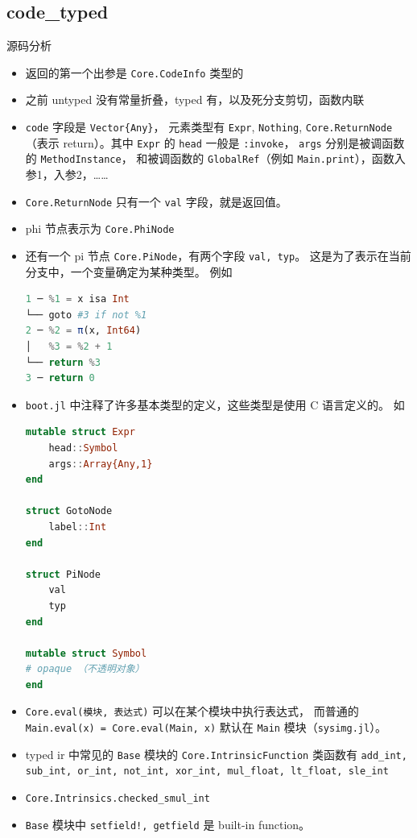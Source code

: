 \subsection{code_typed} 源码分析
\begin{itemize}
\item 返回的第一个出参是 \verb`Core.CodeInfo` 类型的
\item 之前 untyped 没有常量折叠，typed 有，以及死分支剪切，函数内联
\item \verb`code` 字段是 \verb`Vector{Any}`， 元素类型有 \verb`Expr`, \verb`Nothing`, \verb`Core.ReturnNode`（表示 return）。其中 \verb`Expr` 的 \verb`head` 一般是 \verb`:invoke`， \verb`args` 分别是被调函数的 \verb`MethodInstance`， 和被调函数的 \verb`GlobalRef`（例如 \verb`Main.print`），函数入参1，入参2，……
\item \verb`Core.ReturnNode` 只有一个 \verb`val` 字段，就是返回值。
\item phi 节点表示为 \verb`Core.PhiNode`
\item 还有一个 pi 节点 \verb`Core.PiNode`，有两个字段 \verb`val, typ`。 这是为了表示在当前分支中，一个变量确定为某种类型。 例如
\begin{lstlisting}[language=julia]
1 ─ %1 = x isa Int
└── goto #3 if not %1
2 ─ %2 = π(x, Int64)
│   %3 = %2 + 1
└── return %3
3 ─ return 0
\end{lstlisting}
\item \verb`boot.jl` 中注释了许多基本类型的定义，这些类型是使用 C 语言定义的。 如
\begin{lstlisting}[language=julia]
mutable struct Expr
    head::Symbol
    args::Array{Any,1}
end

struct GotoNode
    label::Int
end

struct PiNode
    val
    typ
end

mutable struct Symbol
# opaque （不透明对象）
end
\end{lstlisting}
\item \verb`Core.eval(模块, 表达式)` 可以在某个模块中执行表达式， 而普通的 \verb`Main.eval(x) = Core.eval(Main, x)` 默认在 \verb`Main` 模块（\verb`sysimg.jl`）。
\item typed ir 中常见的 \verb`Base` 模块的 \verb`Core.IntrinsicFunction` 类函数有 \verb`add_int, sub_int, or_int, not_int, xor_int, mul_float, lt_float, sle_int`
\item \verb`Core.Intrinsics.checked_smul_int`
\item \verb`Base` 模块中 \verb`setfield!, getfield` 是 built-in function。
\end{itemize}

